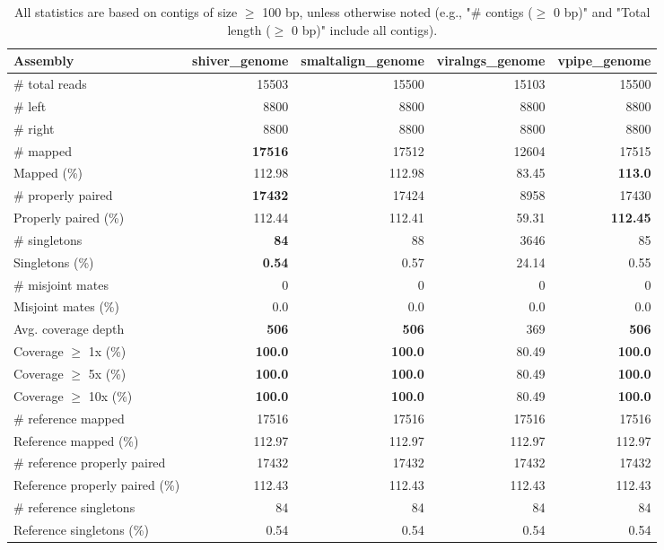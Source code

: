 \documentclass[12pt,a4paper]{article}
\begin{document}
\begin{table}[ht]
\begin{center}
\caption{All statistics are based on contigs of size $\geq$ 100 bp, unless otherwise noted (e.g., "\# contigs ($\geq$ 0 bp)" and "Total length ($\geq$ 0 bp)" include all contigs).}
\begin{tabular}{|l*{4}{|r}|}
\hline
Assembly & shiver\_genome & smaltalign\_genome & viralngs\_genome & vpipe\_genome \\ \hline
\# total reads & 15503 & 15500 & 15103 & 15500 \\ \hline
\# left & 8800 & 8800 & 8800 & 8800 \\ \hline
\# right & 8800 & 8800 & 8800 & 8800 \\ \hline
\# mapped & {\bf 17516} & 17512 & 12604 & 17515 \\ \hline
Mapped (\%) & 112.98 & 112.98 & 83.45 & {\bf 113.0} \\ \hline
\# properly paired & {\bf 17432} & 17424 & 8958 & 17430 \\ \hline
Properly paired (\%) & 112.44 & 112.41 & 59.31 & {\bf 112.45} \\ \hline
\# singletons & {\bf 84} & 88 & 3646 & 85 \\ \hline
Singletons (\%) & {\bf 0.54} & 0.57 & 24.14 & 0.55 \\ \hline
\# misjoint mates & 0 & 0 & 0 & 0 \\ \hline
Misjoint mates (\%) & 0.0 & 0.0 & 0.0 & 0.0 \\ \hline
Avg. coverage depth & {\bf 506} & {\bf 506} & 369 & {\bf 506} \\ \hline
Coverage $\geq$ 1x (\%) & {\bf 100.0} & {\bf 100.0} & 80.49 & {\bf 100.0} \\ \hline
Coverage $\geq$ 5x (\%) & {\bf 100.0} & {\bf 100.0} & 80.49 & {\bf 100.0} \\ \hline
Coverage $\geq$ 10x (\%) & {\bf 100.0} & {\bf 100.0} & 80.49 & {\bf 100.0} \\ \hline
\# reference mapped & 17516 & 17516 & 17516 & 17516 \\ \hline
Reference mapped (\%) & 112.97 & 112.97 & 112.97 & 112.97 \\ \hline
\# reference properly paired & 17432 & 17432 & 17432 & 17432 \\ \hline
Reference properly paired (\%) & 112.43 & 112.43 & 112.43 & 112.43 \\ \hline
\# reference singletons & 84 & 84 & 84 & 84 \\ \hline
Reference singletons (\%) & 0.54 & 0.54 & 0.54 & 0.54 \\ \hline

\end{tabular}
\end{center}
\end{table}
\end{document}
